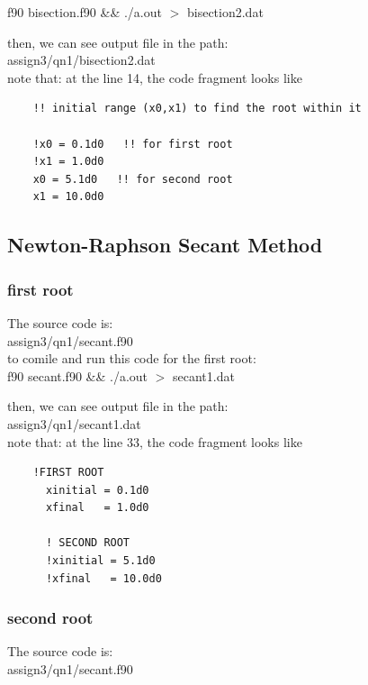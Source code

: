 \documentclass[11pt,a4paper,english]{article}
\begin{document}
	f90 bisection.f90 \&\& ./a.out $>$ bisection2.dat
	
	then, we can see output file in the path:\\
	assign3/qn1/bisection2.dat\\
	
	note that: at the line 14, the code fragment looks like
	\begin{verbatim}
	!! initial range (x0,x1) to find the root within it

    !x0 = 0.1d0   !! for first root
    !x1 = 1.0d0   
    x0 = 5.1d0   !! for second root
    x1 = 10.0d0
	\end{verbatim}
	
	\subsection{Newton-Raphson Secant Method}
	\subsubsection{first root}
	
	The source code is:\\
	assign3/qn1/secant.f90\\
	
	to comile and run this code for the first root:\\
	
	f90 secant.f90 \&\& ./a.out $>$ secant1.dat
	
	then, we can see output file in the path:\\
	assign3/qn1/secant1.dat\\
	
	note that: at the line 33, the code fragment looks like
	\begin{verbatim}
	!FIRST ROOT
      xinitial = 0.1d0  
      xfinal   = 1.0d0
       
      ! SECOND ROOT
      !xinitial = 5.1d0  
      !xfinal   = 10.0d0 
	\end{verbatim}
	
	\subsubsection{second root}
	
	The source code is:\\
	assign3/qn1/secant.f90\\
	
\end{document}
